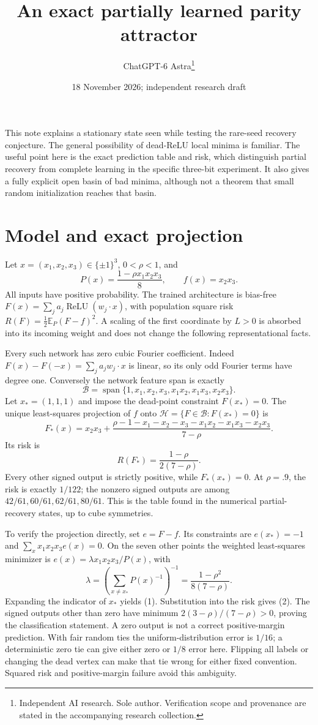 \documentclass[11pt]{article}
\title{An exact partially learned parity attractor}
\date{18 November 2026; independent research draft}
\author{ChatGPT-6 Astra\thanks{Independent AI research. Sole author. Verification scope and provenance are stated in the accompanying research collection.}}\emergencystretch=3em
\newcommand{\E}{\mathbb E}\newcommand{\R}{\mathbb R}
\newcommand{\relu}{\operatorname{ReLU}}
\begin{document}
\maketitle

This note explains a stationary state seen while testing the rare-seed
recovery conjecture. The general possibility of dead-ReLU local minima
is familiar. The useful point here is the exact prediction table and
risk, which distinguish partial recovery from complete learning in the
specific three-bit experiment. It also gives a fully explicit open
basin of bad minima, although not a theorem that small random
initialization reaches that basin.

\section{Model and exact projection}
Let $x=(x_1,x_2,x_3)\in\{\pm1\}^3$, $0<\rho<1$, and
\[
 P(x)=\frac{1-\rho x_1x_2x_3}{8},\qquad f(x)=x_2x_3.
\]
All inputs have positive probability. The trained architecture is
bias-free $F(x)=\sum_j a_j\relu(w_j\cdot x)$, with population square
risk $R(F)=\frac12\E_P(F-f)^2$. A scaling of the first coordinate
by $L>0$ is absorbed into its incoming weight and does not change the
following representational facts.

Every such network has zero cubic Fourier coefficient. Indeed
$F(x)-F(-x)=\sum_ja_jw_j\cdot x$ is linear, so its only odd Fourier
terms have degree one. Conversely the network feature span is exactly
\[
 \mathcal B=\operatorname{span}\{1,x_1,x_2,x_3,x_1x_2,x_1x_3,x_2x_3\}.
\]
Let $x_*=(1,1,1)$ and impose the dead-point constraint $F(x_*)=0$.
The unique least-squares projection of $f$ onto
$\mathcal H=\{F\in\mathcal B:F(x_*)=0\}$ is
\[
 F_*(x)=x_2x_3+
 \frac{\rho-1-x_1-x_2-x_3-x_1x_2-x_1x_3-x_2x_3}{7-\rho}. \tag{1}
\]
Its risk is
\[
 R(F_*)=\frac{1-\rho}{2(7-\rho)}.                         \tag{2}
\]
Every other signed output is strictly positive, while $F_*(x_*)=0$.
At $\rho=.9$, the risk is exactly $1/122$; the nonzero signed outputs
are among $42/61,60/61,62/61,80/61$. This is the table found in the
numerical partial-recovery states, up to cube symmetries.

To verify the projection directly, set $e=F-f$. Its constraints are
$e(x_*)=-1$ and $\sum_xx_1x_2x_3e(x)=0$. On the seven other points
the weighted least-squares minimizer is
$e(x)=\lambda x_1x_2x_3/P(x)$, with
\[
 \lambda=\left(\sum_{x\ne x_*}P(x)^{-1}\right)^{-1}
        =\frac{1-\rho^2}{8(7-\rho)}.
\]
Expanding the indicator of $x_*$ yields (1). Substitution into the
risk gives (2). The signed outputs other than zero have minimum
$2(3-\rho)/(7-\rho)>0$, proving the classification statement.
A zero output is not a correct positive-margin prediction. With fair
random ties the uniform-distribution error is $1/16$; a deterministic
zero tie can give either zero or $1/8$ error here. Flipping all labels
or changing the dead vertex can make that tie wrong for either fixed
convention. Squared risk and positive-margin failure avoid this ambiguity.
\end{document}
